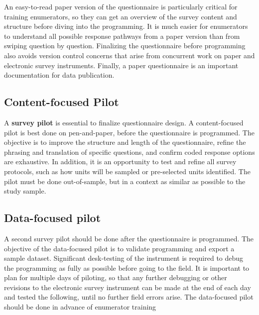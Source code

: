 An easy-to-read paper version of the questionnaire is particularly critical for training enumerators, so they can get an overview of the survey content and structure before diving into the programming.
It is much easier for enumerators to understand all possible response pathways from a paper version than from swiping question by question.
Finalizing the questionnaire before programming also avoids version control concerns that arise from concurrent work on paper and electronic survey instruments.
Finally, a paper questionnaire is an important documentation for data publication.


\subsection{Content-focused Pilot}
A \textbf{survey pilot} is essential to finalize questionnaire design.
A content-focused pilot  is best done on pen-and-paper, before the questionnaire is programmed.
The objective is to improve the structure and length of the questionnaire, refine the phrasing and translation of specific questions, and confirm coded response options are exhaustive. In addition, it is an opportunity to test and refine all survey protocols, such as how units will be sampled or pre-selected units identified. The pilot must be done out-of-sample, but in a context as similar as possible to the study sample.

\subsection{Data-focused pilot}
A second survey pilot should be done after the questionnaire is programmed.
The objective of the data-focused pilot is to validate programming and export a sample dataset.
Significant desk-testing of the instrument is required to debug the programming as fully as possible before going to the field.
It is important to plan for multiple days of piloting, so that any further debugging or other revisions to the electronic survey instrument can be made at the end of each day and tested the following, until no further field errors arise.
The data-focused pilot should be done in advance of enumerator training


